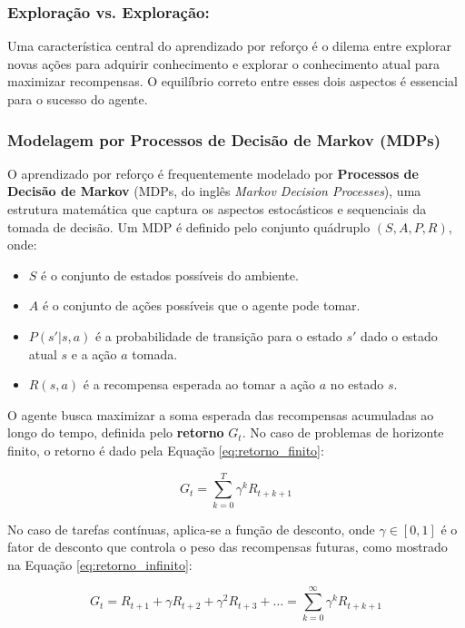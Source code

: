 \subsubsection*{Exploração vs. Exploração:}
Uma característica central do aprendizado por reforço é o dilema entre explorar novas ações para adquirir conhecimento e explorar o conhecimento atual para maximizar recompensas. O equilíbrio correto entre esses dois aspectos é essencial para o sucesso do agente.

\subsubsection*{Modelagem por Processos de Decisão de Markov (MDPs)}

O aprendizado por reforço é frequentemente modelado por \textbf{Processos de Decisão de Markov} (MDPs, do inglês \textit{Markov Decision Processes}), uma estrutura matemática que captura os aspectos estocásticos e sequenciais da tomada de decisão. Um MDP é definido pelo conjunto quádruplo \((S, A, P, R)\), onde:

\begin{itemize}
    \item \(S\) é o conjunto de estados possíveis do ambiente.
    \item \(A\) é o conjunto de ações possíveis que o agente pode tomar.
    \item \(P(s'|s, a)\) é a probabilidade de transição para o estado \(s'\) dado o estado atual \(s\) e a ação \(a\) tomada.
    \item \(R(s, a)\) é a recompensa esperada ao tomar a ação \(a\) no estado \(s\).
\end{itemize}

O agente busca maximizar a soma esperada das recompensas acumuladas ao longo do tempo, definida pelo \textbf{retorno} \(G_t\). No caso de problemas de horizonte finito, o retorno é dado pela Equação \ref{eq:retorno_finito}:

\begin{equation}
\label{eq:retorno_finito}
G_t = \sum_{k=0}^{T} \gamma^k R_{t+k+1}
\end{equation}

No caso de tarefas contínuas, aplica-se a função de desconto, onde \(\gamma \in [0, 1]\) é o fator de desconto que controla o peso das recompensas futuras, como mostrado na Equação \ref{eq:retorno_infinito}:

\begin{equation}
\label{eq:retorno_infinito}
G_t = R_{t+1} + \gamma R_{t+2} + \gamma^2 R_{t+3} + \dots = \sum_{k=0}^{\infty} \gamma^k R_{t+k+1}
\end{equation}

